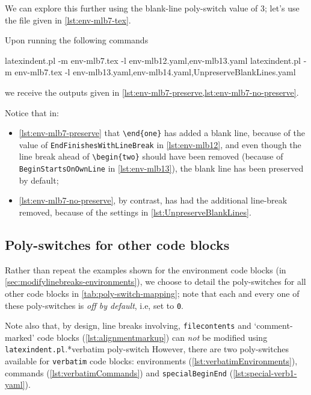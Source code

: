 	We can explore this further using the blank-line poly-switch value of
	$3$; let's use the file given in \cref{lst:env-mlb7-tex}.


	Upon running the following commands
	\begin{commandshell}
latexindent.pl -m env-mlb7.tex -l env-mlb12.yaml,env-mlb13.yaml
latexindent.pl -m env-mlb7.tex -l env-mlb13.yaml,env-mlb14.yaml,UnpreserveBlankLines.yaml
            \end{commandshell}
	we receive the outputs given in \cref{lst:env-mlb7-preserve,lst:env-mlb7-no-preserve}.


	Notice that in:
	\begin{itemize}
		\item \cref{lst:env-mlb7-preserve} that \lstinline!\end{one}! has added a blank line,
		      because of the value of \texttt{EndFinishesWithLineBreak} in \vref{lst:env-mlb12}, and
		      even though the line break ahead of \lstinline!\begin{two}! should have been removed
		      (because of \texttt{BeginStartsOnOwnLine} in \vref{lst:env-mlb13}), the blank line
		      has been preserved by default;
		\item \cref{lst:env-mlb7-no-preserve}, by contrast, has had the additional line-break removed,
		      because of the settings in \cref{lst:UnpreserveBlankLines}.
	\end{itemize}

\subsection{Poly-switches for other code blocks}
	Rather than repeat the examples shown for the environment code blocks (in
	\vref{sec:modifylinebreaks-environments}), we choose to detail the poly-switches for all other code
	blocks in \cref{tab:poly-switch-mapping}; note that each and every one of these
	poly-switches is \emph{off by default}, i.e, set to \texttt{0}.

    Note also that, by design, line breaks involving,
	\texttt{filecontents} and `comment-marked' code blocks
	(\vref{lst:alignmentmarkup}) can \emph{not} be modified using
	\texttt{latexindent.pl}.*{verbatim poly-switch} However, there are two poly-switches available for  \texttt{verbatim}
    code blocks: environments (\vref{lst:verbatimEnvironments}), commands (\vref{lst:verbatimCommands}) and \texttt{specialBeginEnd} (\vref{lst:special-verb1-yaml}).

